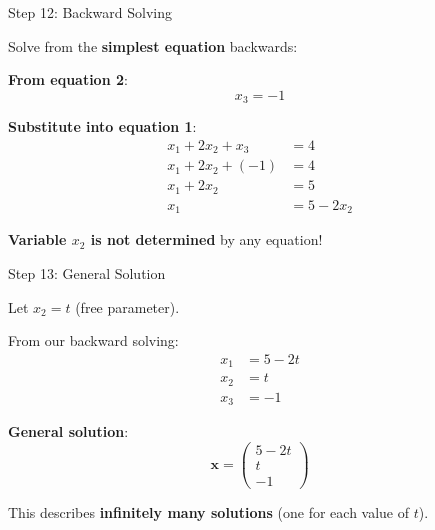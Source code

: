 \documentclass[10pt]{beamer}
\theoremstyle{definition}
\newcommand{\x}[1]{\alert{\textbf{#1}}}
\begin{document}
\begin{frame}{Step 12: Backward Solving}

Solve from the \x{simplest equation} backwards:

\vspace{1em}

\x{From equation 2}:
$$x_3 = -1$$

\vspace{1em}

\x{Substitute into equation 1}:
\begin{align*}
x_1 + 2x_2 + x_3 &= 4 \\
x_1 + 2x_2 + (-1) &= 4 \\
x_1 + 2x_2 &= 5 \\
x_1 &= 5 - 2x_2
\end{align*}

\vspace{1em}

\x{Variable $x_2$ is not determined} by any equation!

\end{frame}

\begin{frame}{Step 13: General Solution}

Let $x_2 = t$ (free parameter).

\vspace{1em}

From our backward solving:
\begin{align*}
x_1 &= 5 - 2t \\
x_2 &= t \\
x_3 &= -1
\end{align*}

\vspace{1em}

\x{General solution}:
$$\mathbf{x} = \begin{pmatrix} 5 - 2t \\ t \\ -1 \end{pmatrix}$$

\vspace{1em}

This describes \x{infinitely many solutions} (one for each value of $t$).

\end{frame}
\end{document}
